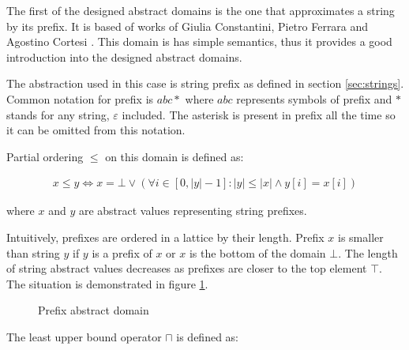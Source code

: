 \documentclass[12pt,final,oneside]{fithesis2}
\theoremstyle{definition}
\begin{document}
The first of the designed abstract domains is the one that approximates
a string by its prefix. It is based of works of Giulia Constantini,
Pietro Ferrara and Agostino Cortesi \cite{Constantini11-1}. This domain
is has simple semantics, thus it provides a good introduction into the
designed abstract domains.

The abstraction used in this case is string prefix as defined in section
\ref{sec:strings}. Common notation for prefix is $abc*$ where $abc$
represents symbols of prefix and $*$ stands for any string, $\varepsilon$
included. The asterisk is present in prefix all the time so it can be
omitted from this notation.

Partial ordering $\leq$ on this domain is defined as:

\begin{align*}
x \leq y \Leftrightarrow
  x = \bot \lor (\forall i \in [0, |y| - 1] :
  |y| \leq |x| \land y[i] = x[i])
\end{align*}

where $x$ and $y$ are abstract values representing string prefixes.

Intuitively, prefixes are ordered in a lattice by their length. Prefix
$x$ is smaller than string $y$ if $y$ is a
prefix of $x$ or $x$ is the bottom of the domain $\bot$.
The length of string abstract values decreases as prefixes are closer to
the top element $\top$. The situation is demonstrated in figure
\ref{fig:prefixlattice}.

\begin{figure}[h]
\centering
{}
\caption{Prefix abstract domain}
\label{fig:prefixlattice}
\end{figure}

The least upper bound operator $\sqcap$ is defined as:
\end{document}
